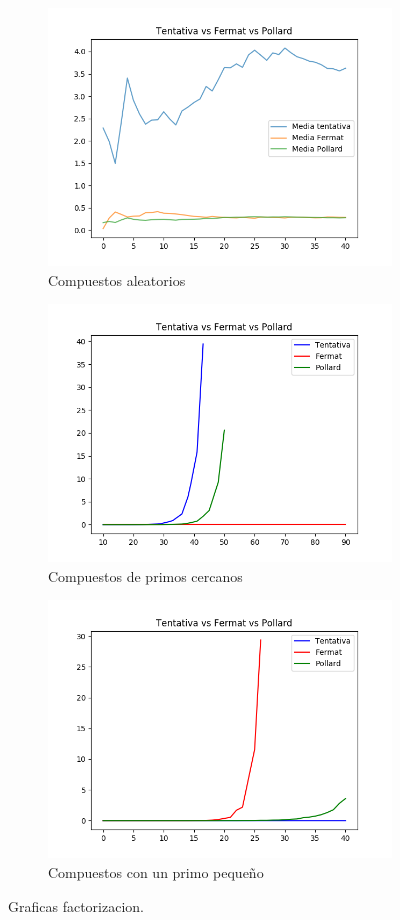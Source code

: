 \documentclass[12pt,spanish]{article}
\begin{document}
\begin{figure}[!htbp]			
	\begin{subfigure}{.5\textwidth}
		\centering
		\includegraphics[width=.8\linewidth]{EvolucionMedias}
		\caption{Compuestos aleatorios}
		\label{fig:sfig21}
	\end{subfigure}%
	\begin{subfigure}{.5\textwidth}
		\centering
		\includegraphics[width=.8\linewidth]{NearComp}
		\caption{Compuestos de primos cercanos}
		\label{fig:sfig22}
	\end{subfigure}
	\begin{subfigure}{.5\textwidth}
		\centering
		\includegraphics[width=.8\linewidth]{VentajaTentativa}
		\caption{Compuestos con un primo pequeño}
		\label{fig:sfig23}
	\end{subfigure}
	\caption{Graficas factorizacion.}
	\label{fig:fig2}
\end{figure}
		
\end{document}

